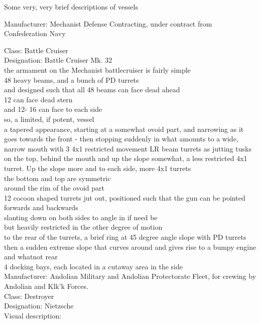 Some very, very brief descriptions of vessels

Manufacturer: Mechanist Defense Contracting, under contract from Confederation Navy

Class: Battle Cruiser\\
Designation: Battle Cruiser Mk. 32\\

the armament on the Mechanist battlecruiser is fairly simple\\
48 heavy beams, and a bunch of PD turrets\\
and designed such that all 48 beams can face dead ahead\\
12 can face dead stern\\
and 12- 16 can face to each side\\
so, a limited, if potent, vessel\\
a tapered appearance, starting at a somewhat ovoid part, and narrowing as it goes towards the front - then stopping suddenly in what amounts to a wide, narrow mouth with 3 4x1 restricted movement LR beam turrets as jutting tusks\\
on the top, behind the mouth and up the slope somewhat, a less restricted 4x1 turret. Up the slope more and to each side, more 4x1 turrets\\
the bottom and top are symmetric\\
around the rim of the ovoid part\\
12 cocoon shaped turrets jut out, positioned such that the gun can be pointed forwards and backwards\\
slanting down on both sides to angle in if need be\\
but heavily restricted in the other degree of motion\\
to the rear of the turrets, a brief ring at 45 degree angle slope with PD turrets\\
then a sudden extreme slope that curves around and gives rise to a bumpy engine and whatnot rear\\
4 docking bays, each located in a cutaway area in the side\\


Manufacturer: Andolian Military and Andolian Protectorate Fleet, for crewing by Andolian and Klk'k Forces.\\
Class: Destroyer\\
Designation: Nietzsche\\

Visual description:\\


